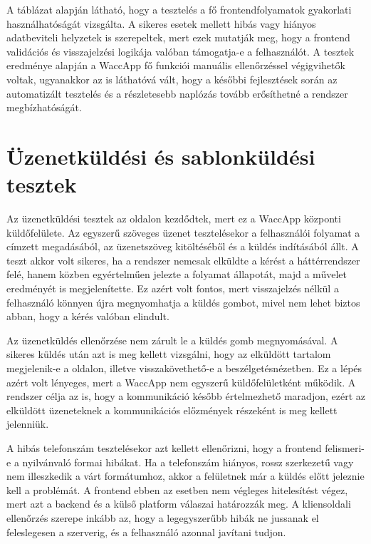 A táblázat alapján látható, hogy a tesztelés a fő frontendfolyamatok gyakorlati használhatóságát vizsgálta. A sikeres esetek mellett hibás vagy hiányos adatbeviteli helyzetek is szerepeltek, mert ezek mutatják meg, hogy a frontend validációs és visszajelzési logikája valóban támogatja-e a felhasználót. A tesztek eredménye alapján a WaccApp fő funkciói manuális ellenőrzéssel végigvihetők voltak, ugyanakkor az is láthatóvá vált, hogy a későbbi fejlesztések során az automatizált tesztelés és a részletesebb naplózás tovább erősíthetné a rendszer megbízhatóságát.

\section{Üzenetküldési és sablonküldési tesztek}

Az üzenetküldési tesztek az  oldalon kezdődtek, mert ez a WaccApp központi küldőfelülete. Az egyszerű szöveges üzenet tesztelésekor a felhasználói folyamat a címzett megadásából, az üzenetszöveg kitöltéséből és a küldés indításából állt. A teszt akkor volt sikeres, ha a rendszer nemcsak elküldte a kérést a háttérrendszer felé, hanem közben egyértelműen jelezte a folyamat állapotát, majd a művelet eredményét is megjelenítette. Ez azért volt fontos, mert visszajelzés nélkül a felhasználó könnyen újra megnyomhatja a küldés gombot, mivel nem lehet biztos abban, hogy a kérés valóban elindult.

Az üzenetküldés ellenőrzése nem zárult le a küldés gomb megnyomásával. A sikeres küldés után azt is meg kellett vizsgálni, hogy az elküldött tartalom megjelenik-e a  oldalon, illetve visszakövethető-e a  beszélgetésnézetben. Ez a lépés azért volt lényeges, mert a WaccApp nem egyszerű küldőfelületként működik. A rendszer célja az is, hogy a kommunikáció később értelmezhető maradjon, ezért az elküldött üzeneteknek a kommunikációs előzmények részeként is meg kellett jelenniük.

A hibás telefonszám tesztelésekor azt kellett ellenőrizni, hogy a frontend felismeri-e a nyilvánvaló formai hibákat. Ha a telefonszám hiányos, rossz szerkezetű vagy nem illeszkedik a várt formátumhoz, akkor a felületnek már a küldés előtt jeleznie kell a problémát. A frontend ebben az esetben nem végleges hitelesítést végez, mert azt a backend és a külső platform válaszai határozzák meg. A kliensoldali ellenőrzés szerepe inkább az, hogy a legegyszerűbb hibák ne jussanak el feleslegesen a szerverig, és a felhasználó azonnal javítani tudjon.

